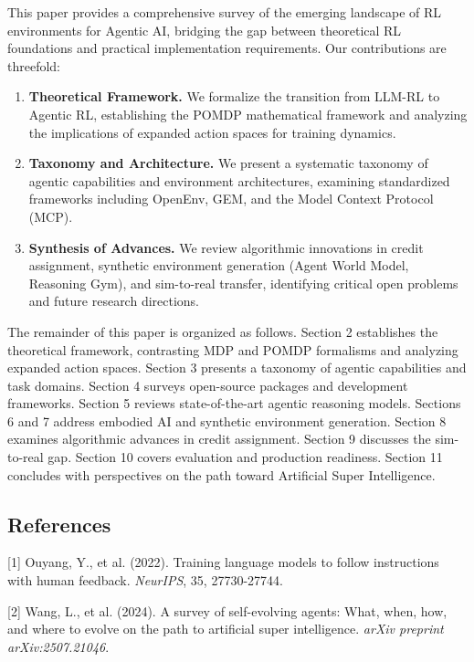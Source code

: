 This paper provides a comprehensive survey of the emerging landscape of RL environments for Agentic AI, bridging the gap between theoretical RL foundations and practical implementation requirements. Our contributions are threefold:

\begin{enumerate}
    \item \textbf{Theoretical Framework.} We formalize the transition from LLM-RL to Agentic RL, establishing the POMDP mathematical framework and analyzing the implications of expanded action spaces for training dynamics.

    \item \textbf{Taxonomy and Architecture.} We present a systematic taxonomy of agentic capabilities and environment architectures, examining standardized frameworks including OpenEnv, GEM, and the Model Context Protocol (MCP).

    \item \textbf{Synthesis of Advances.} We review algorithmic innovations in credit assignment, synthetic environment generation (Agent World Model, Reasoning Gym), and sim-to-real transfer, identifying critical open problems and future research directions.

\end{enumerate}
The remainder of this paper is organized as follows. Section 2 establishes the theoretical framework, contrasting MDP and POMDP formalisms and analyzing expanded action spaces. Section 3 presents a taxonomy of agentic capabilities and task domains. Section 4 surveys open-source packages and development frameworks. Section 5 reviews state-of-the-art agentic reasoning models. Sections 6 and 7 address embodied AI and synthetic environment generation. Section 8 examines algorithmic advances in credit assignment. Section 9 discusses the sim-to-real gap. Section 10 covers evaluation and production readiness. Section 11 concludes with perspectives on the path toward Artificial Super Intelligence.

\subsection{References}

[1] Ouyang, Y., et al. (2022). Training language models to follow instructions with human feedback. \textit{NeurIPS}, 35, 27730-27744.

[2] Wang, L., et al. (2024). A survey of self-evolving agents: What, when, how, and where to evolve on the path to artificial super intelligence. \textit{arXiv preprint arXiv:2507.21046}.

